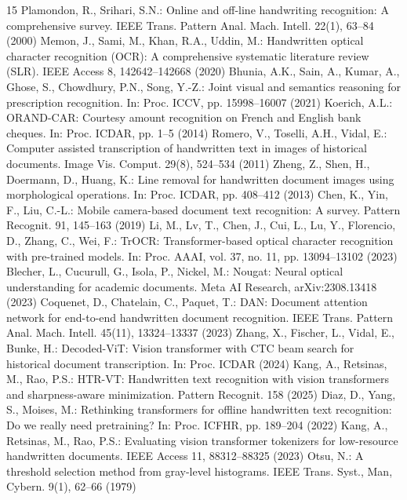 \documentclass[twocolumn,10pt,a4paper]{article}
\begin{document}
\begin{thebibliography}{15}
 Plamondon, R., Srihari, S.N.: Online and off-line handwriting recognition: A comprehensive survey. IEEE Trans. Pattern Anal. Mach. Intell. 22(1), 63--84 (2000)
 Memon, J., Sami, M., Khan, R.A., Uddin, M.: Handwritten optical character recognition (OCR): A comprehensive systematic literature review (SLR). IEEE Access 8, 142642--142668 (2020)
 Bhunia, A.K., Sain, A., Kumar, A., Ghose, S., Chowdhury, P.N., Song, Y.-Z.: Joint visual and semantics reasoning for prescription recognition. In: Proc. ICCV, pp. 15998--16007 (2021)
 Koerich, A.L.: ORAND-CAR: Courtesy amount recognition on French and English bank cheques. In: Proc. ICDAR, pp. 1--5 (2014)
 Romero, V., Toselli, A.H., Vidal, E.: Computer assisted transcription of handwritten text in images of historical documents. Image Vis. Comput. 29(8), 524--534 (2011)
 Zheng, Z., Shen, H., Doermann, D., Huang, K.: Line removal for handwritten document images using morphological operations. In: Proc. ICDAR, pp. 408--412 (2013)
 Chen, K., Yin, F., Liu, C.-L.: Mobile camera-based document text recognition: A survey. Pattern Recognit. 91, 145--163 (2019)
 Li, M., Lv, T., Chen, J., Cui, L., Lu, Y., Florencio, D., Zhang, C., Wei, F.: TrOCR: Transformer-based optical character recognition with pre-trained models. In: Proc. AAAI, vol. 37, no. 11, pp. 13094--13102 (2023)
 Blecher, L., Cucurull, G., Isola, P., Nickel, M.: Nougat: Neural optical understanding for academic documents. Meta AI Research, arXiv:2308.13418 (2023)
 Coquenet, D., Chatelain, C., Paquet, T.: DAN: Document attention network for end-to-end handwritten document recognition. IEEE Trans. Pattern Anal. Mach. Intell. 45(11), 13324--13337 (2023)
 Zhang, X., Fischer, L., Vidal, E., Bunke, H.: Decoded-ViT: Vision transformer with CTC beam search for historical document transcription. In: Proc. ICDAR (2024)
 Kang, A., Retsinas, M., Rao, P.S.: HTR-VT: Handwritten text recognition with vision transformers and sharpness-aware minimization. Pattern Recognit. 158 (2025)
 Diaz, D., Yang, S., Moises, M.: Rethinking transformers for offline handwritten text recognition: Do we really need pretraining? In: Proc. ICFHR, pp. 189--204 (2022)
 Kang, A., Retsinas, M., Rao, P.S.: Evaluating vision transformer tokenizers for low-resource handwritten documents. IEEE Access 11, 88312--88325 (2023)
 Otsu, N.: A threshold selection method from gray-level histograms. IEEE Trans. Syst., Man, Cybern. 9(1), 62--66 (1979)
\end{thebibliography}
\end{document}
